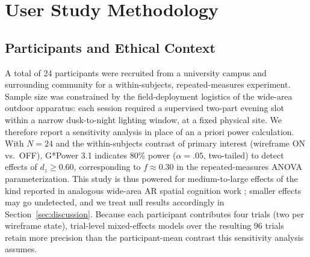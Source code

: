%
%

\section{User Study Methodology}

\subsection{Participants and Ethical Context}

A total of 24 participants were recruited from a university campus and
surrounding community for a within-subjects, repeated-measures experiment.
Sample size was constrained by the field-deployment logistics of the wide-area
outdoor apparatus: each session required a supervised two-part evening slot
within a narrow dusk-to-night lighting window, at a fixed physical site. We
therefore report a sensitivity analysis in place of an a priori power
calculation. With $N=24$ and the within-subjects contrast of primary interest
(wireframe ON vs.\ OFF), G*Power 3.1 indicates 80\% power ($\alpha=.05$,
two-tailed) to detect effects of $d_z \geq 0.60$, corresponding to $f \approx
0.30$ in the repeated-measures ANOVA parameterization. This study is thus
powered for medium-to-large effects of the kind reported in analogous
wide-area AR spatial cognition work \cite{kim_investigating_2022,
kumaran_impact_2023}; smaller effects may go undetected, and we treat null
results accordingly in Section~\ref{sec:discussion}. Because each participant
contributes four trials (two per wireframe state), trial-level mixed-effects
models over the resulting 96 trials retain more precision than the
participant-mean contrast this sensitivity analysis assumes.


